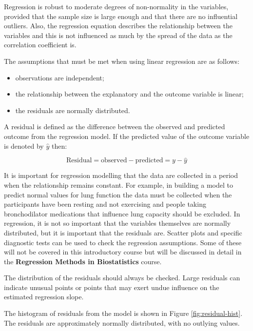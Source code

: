 \documentclass[
]{memoir}
\providecommand{\tightlist}{%
  \setlength{\itemsep}{0pt}\setlength{\parskip}{0pt}}
\begin{document}
Regression is robust to moderate degrees of non-normality in the variables, provided that the sample size is large enough and that there are no influential outliers. Also, the regression equation describes the relationship between the variables and this is not influenced as much by the spread of the data as the correlation coefficient is.

The assumptions that must be met when using linear regression are as follows:

\begin{itemize}
\tightlist
\item
  observations are independent;
\item
  the relationship between the explanatory and the outcome variable is linear;
\item
  the residuals are normally distributed.
\end{itemize}

A residual is defined as the difference between the observed and predicted outcome from the regression model. If the predicted value of the outcome variable is denoted by \(\hat y\) then:

\[ \text{Residual} = \text{observed} - \text{predicted} = y - \hat y\]

It is important for regression modelling that the data are collected in a period when the relationship remains constant. For example, in building a model to predict normal values for lung function the data must be collected when the participants have been resting and not exercising and people taking bronchodilator medications that influence lung capacity should be excluded. In regression, it is not so important that the variables themselves are normally distributed, but it is important that the residuals are. Scatter plots and specific diagnostic tests can be used to check the regression assumptions. Some of these will not be covered in this introductory course but will be discussed in detail in the \textbf{Regression Methods in Biostatistics} course.

The distribution of the residuals should always be checked. Large residuals can indicate unusual points or points that may exert undue influence on the estimated regression slope.

The histogram of residuals from the model is shown in Figure \ref{fig:residual-hist}. The residuals are approximately normally distributed, with no outlying values.
\end{document}
